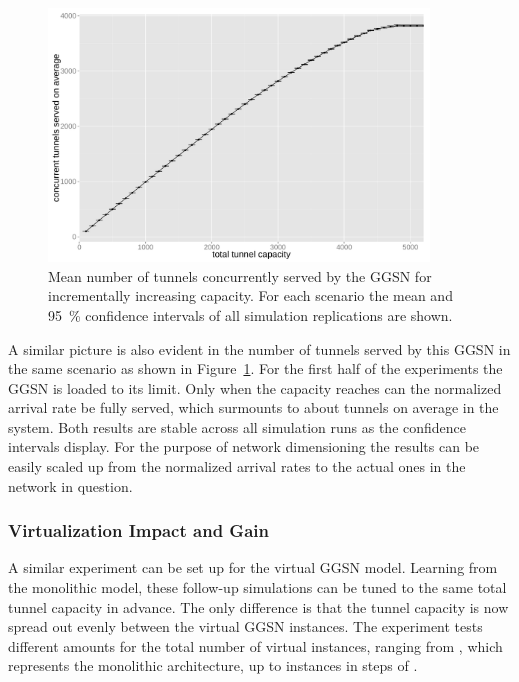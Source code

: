\begin{figure}[htb]
	\centering
	\includegraphics[width=0.9\textwidth]{images/R-monolithic-tunnelusage.pdf}
	\caption{Mean number of tunnels concurrently served by the \gls{GGSN} for incrementally increasing capacity. For each scenario the mean and \SI{95}{\percent} confidence intervals of all simulation replications are shown.}
\label{c4:fig:traditional_tunnelusage}
\end{figure}

A similar picture is also evident in the number of tunnels served by this \gls{GGSN} in the same scenario as shown in Figure~\ref{c4:fig:traditional_tunnelusage}. For the first half of the experiments the \gls{GGSN} is loaded to its limit. Only when the capacity reaches  can the normalized arrival rate be fully served, which surmounts to about  tunnels on average in the system. Both results are stable across all simulation runs as the confidence intervals display. For the purpose of network dimensioning the results can be easily scaled up from the normalized arrival rates to the actual ones in the network in question.


\subsubsection{Virtualization Impact and Gain}

A similar experiment can be set up for the virtual \gls{GGSN} model. Learning from the monolithic model, these follow-up simulations can be tuned to the same total tunnel capacity in advance. The only difference is that the tunnel capacity is now spread out evenly between the virtual \gls{GGSN} instances. The experiment tests different amounts for the total number of virtual instances, ranging from , which represents the monolithic architecture, up to  instances in steps of .

